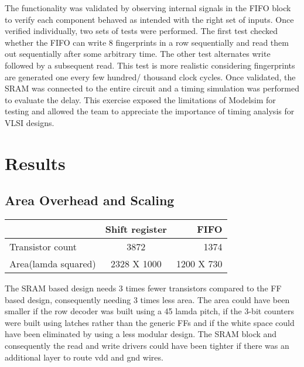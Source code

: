 \documentclass[10pt,journal,compsoc]{IEEEtran}
\begin{document}
The functionality was validated by observing internal signals in the FIFO block to verify each component behaved as intended with the right set of inputs. Once verified individually, two sets of tests were performed. The first test checked whether the FIFO can write 8 fingerprints in a row sequentially and read them out sequentially after some arbitrary time. The other test alternates write followed by a subsequent read. This test is more realistic considering fingerprints are generated one every few hundred/ thousand clock cycles. Once validated, the SRAM was connected to the entire circuit and a timing simulation was performed to evaluate the delay.
 This exercise exposed the limitations of Modelsim for testing and allowed the team to appreciate the importance of timing analysis for VLSI designs.


\section{Results}
\subsection{Area Overhead and Scaling}


\begin{center}
  \begin{tabular}{ l || c | r }
    \hline
     & Shift register & FIFO  \\ \hline
    Transistor count & 3872 & 1374 \\ \hline
    Area(lamda squared) & 2328 X 1000  & 1200 X 730 \\
    \hline
  \end{tabular}
\end{center}

The SRAM based design needs 3 times fewer transistors compared to the FF based design, consequently needing 3 times less area. The area could have been smaller if the row decoder was built using a 45 lamda pitch, if the 3-bit counters were built using latches rather than the generic FFs and if the white space could have been eliminated by using a less modular design. The SRAM block and consequently the read and write drivers could have been tighter if there was an additional layer to route vdd and gnd wires.	
\end{document}
